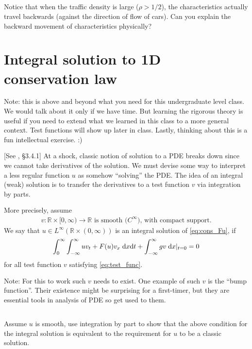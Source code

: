 \documentclass[11pt,letterpaper]{report}
\begin{document}
\subsection{}
Notice that when the traffic density is large ($\rho>1/2$), the characteristics actually travel backwards (against the direction of flow of cars). Can you explain the backward movement of characteristics physically?

\section{Integral solution to 1D conservation law}
Note: this is above and beyond what you need for this undergraduate level class. We would talk about it only if we have time. But learning the rigorous theory is useful if you need to extend what we learned in this class to a more general context. Test functions will show up later in class. Lastly, thinking about this is a fun intellectual exercise. :)

[See \cite{Evans_10}, \S 3.4.1] At a shock, classic notion of solution to a PDE breaks down since we cannot take derivatives of the solution. We must devise some way to interpret a less regular function $u$ as somehow ``solving'' the PDE. The idea of an integral (weak) solution is to transfer the derivatives to a test function $v$ via integration by parts. 

More precisely, assume
\begin{align}
    v: \mathbb{R}\times[0,\infty)\to\mathbb{R} \text{ is smooth ($C^\infty$), with compact support}.\label{eq:test_func}
\end{align}
We say that $u\in L^\infty(\mathbb{R}\times(0,\infty))$ is an integral solution of \eqref{eq:cons_Fu}, if
\begin{align}
    \int^\infty_0\int^\infty_{-\infty} uv_t+F(u)v_x\;\mathrm{d} x\mathrm{d} t+\int^\infty_{-\infty} gv\;\mathrm{d} x|_{t=0} = 0
\end{align}
for all test function $v$ satisfying \eqref{eq:test_func}.

Note: For this to work such $v$ needs to exist. One example of such $v$ is the ``bump function''. Their existence might be surprising for a first-timer, but they are essential tools in analysis of PDE so get used to them.

\subsection{}
Assume $u$ is smooth, use integration by part to show that the above condition for the integral solution is equivalent to the requirement for $u$ to be a classic solution.
\end{document}
